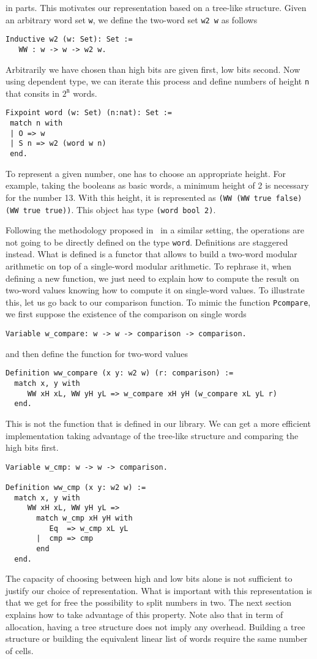 in parts. 
This motivates our representation based on a tree-like structure. Given an arbitrary word set {\tt w}, we define
the two-word set {\tt w2 w} as follows 
\begin{verbatim}
Inductive w2 (w: Set): Set :=  
   WW : w -> w -> w2 w.
\end{verbatim}
Arbitrarily we have chosen than high bits are given first, low bits
second. Now using dependent type, we can iterate this process and define
numbers of height {\tt n} that consits in $2^\texttt{n}$ words.
\begin{verbatim}
Fixpoint word (w: Set) (n:nat): Set :=
 match n with
 | O => w
 | S n => w2 (word w n)
 end.
\end{verbatim}
To represent a given number, one has to choose an appropriate height.
For example, taking the booleans as basic words, a minimum
height of 2 is necessary for the number 13. With this height, it is represented 
as {\tt (WW (WW true false) (WW true true))}. This object has type {\tt (word bool 2)}.

Following the methodology proposed in~\cite{GreMa} in a similar setting, 
the operations are not going to be directly defined on the type {\tt word}.
Definitions are staggered instead. What is defined is a functor that 
allows to build a two-word modular arithmetic on top of a single-word modular
arithmetic. To rephrase it,
when defining a new function, we just need to explain how to compute the 
result on two-word values knowing how to compute it on single-word values.
To illustrate this, let us go back to our comparison function. 
To mimic the function {\tt Pcompare}, we first suppose the existence
of the comparison on single words
\begin{verbatim}
Variable w_compare: w -> w -> comparison -> comparison.
\end{verbatim}
and then define the function for two-word values
\begin{verbatim}
Definition ww_compare (x y: w2 w) (r: comparison) :=
  match x, y with
     WW xH xL, WW yH yL => w_compare xH yH (w_compare xL yL r) 
  end.
\end{verbatim}
This is not the function that is defined in our library. We can get
a more efficient implementation taking  advantage of the tree-like 
structure and comparing the high bits first.  
\begin{verbatim}
Variable w_cmp: w -> w -> comparison.

Definition ww_cmp (x y: w2 w) :=
  match x, y with
     WW xH xL, WW yH yL => 
       match w_cmp xH yH with 
          Eq  => w_cmp xL yL
       |  cmp => cmp
       end
  end. 
\end{verbatim}
The capacity of choosing between high and low bits alone is
not sufficient to justify our choice of representation. What
is important with this representation is that we get for free
the possibility to split numbers in two. The next section 
explains how to take advantage of this property.
Note also that in term of allocation, having a tree structure
does not imply any overhead. Building a tree structure or 
building the equivalent linear list of words require the same number of cells.

